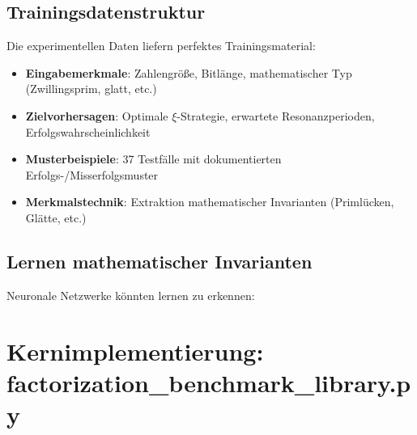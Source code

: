 	\subsection{Trainingsdatenstruktur}
	
	Die experimentellen Daten liefern perfektes Trainingsmaterial:
	
	\begin{itemize}
		\item \textbf{Eingabemerkmale}: Zahlengröße, Bitlänge, mathematischer Typ (Zwillingsprim, glatt, etc.)
		\item \textbf{Zielvorhersagen}: Optimale $\xi$-Strategie, erwartete Resonanzperioden, Erfolgswahrscheinlichkeit
		\item \textbf{Musterbeispiele}: 37 Testfälle mit dokumentierten Erfolgs-/Misserfolgsmuster
		\item \textbf{Merkmalstechnik}: Extraktion mathematischer Invarianten (Primlücken, Glätte, etc.)
	\end{itemize}
	
	\subsection{Lernen mathematischer Invarianten}
	
	Neuronale Netzwerke könnten lernen zu erkennen:
	
	\begin{table}[H]
		\centering
		\caption{Lernbare mathematische Muster}
		\label{tab:learnable_patterns}
	\end{table}
	
	\section{Kernimplementierung: factorization\_benchmark\_library.py}
	

